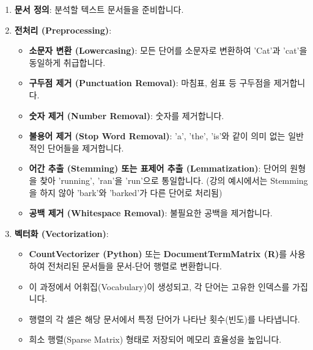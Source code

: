 \documentclass[11pt,a4paper]{article}
\begin{document}
\begin{enumerate}
    \item \textbf{문서 정의}: 분석할 텍스트 문서들을 준비합니다.
    \item \textbf{전처리 (Preprocessing)}:
    \begin{itemize}
        \item \textbf{소문자 변환 (Lowercasing)}: 모든 단어를 소문자로 변환하여 'Cat'과 'cat'을 동일하게 취급합니다.
        \item \textbf{구두점 제거 (Punctuation Removal)}: 마침표, 쉼표 등 구두점을 제거합니다.
        \item \textbf{숫자 제거 (Number Removal)}: 숫자를 제거합니다.
        \item \textbf{불용어 제거 (Stop Word Removal)}: 'a', 'the', 'is'와 같이 의미 없는 일반적인 단어들을 제거합니다.
        \item \textbf{어간 추출 (Stemming) 또는 표제어 추출 (Lemmatization)}: 단어의 원형을 찾아 'running', 'ran'을 'run'으로 통일합니다. (강의 예시에서는 Stemming을 하지 않아 'bark'와 'barked'가 다른 단어로 처리됨)
        \item \textbf{공백 제거 (Whitespace Removal)}: 불필요한 공백을 제거합니다.
    \end{itemize}
    \item \textbf{벡터화 (Vectorization)}:
    \begin{itemize}
        \item \textbf{CountVectorizer (Python)} 또는 \textbf{DocumentTermMatrix (R)}를 사용하여 전처리된 문서들을 문서-단어 행렬로 변환합니다.
        \item 이 과정에서 어휘집(Vocabulary)이 생성되고, 각 단어는 고유한 인덱스를 가집니다.
        \item 행렬의 각 셀은 해당 문서에서 특정 단어가 나타난 횟수(빈도)를 나타냅니다.
        \item 희소 행렬(Sparse Matrix) 형태로 저장되어 메모리 효율성을 높입니다.
    \end{itemize}
\end{enumerate}
\end{document}
